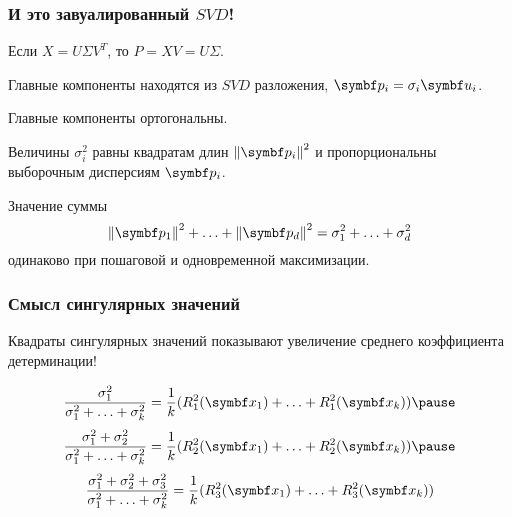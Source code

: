 \begin{frame}
  \frametitle{И это завуалированный $SVD$!}

  Если $X = U\Sigma V^T$, то $P = XV = U\Sigma$.

  Главные компоненты находятся из $SVD$ разложения, $\bp_i = \sigma_i \bu_i$. 

  Главные компоненты ортогональны. 

  Величины $\sigma^2_i$ равны квадратам длин $\norm{\bp_i}^2$ 
  и пропорциональны выборочным дисперсиям $\bp_i$.  \pause

Значение суммы 
\[
  \norm{\bp_1}^2 + \ldots + \norm{\bp_d}^2 = \sigma^2_1 + \ldots + \sigma^2_d
\]
одинаково при пошаговой и одновременной максимизации.


\end{frame}


\begin{frame}
  \frametitle{Смысл сингулярных значений}

  Квадраты сингулярных значений показывают увеличение среднего коэффициента детерминации!


\[
 \frac{\sigma^2_1}{\sigma^2_1 + \ldots + \sigma^2_k} = \frac{1}{k} (R_1^2(\bx_1) + \ldots + R_1^2(\bx_k))  \pause 
 \]
 \[
 \frac{\sigma^2_1 + \sigma^2_2}{\sigma^2_1 + \ldots + \sigma^2_k} = \frac{1}{k} (R_2^2(\bx_1) + \ldots + R_2^2(\bx_k)) \pause
 \]
\[
 \frac{\sigma^2_1 + \sigma^2_2 + \sigma^2_3}{\sigma^2_1 + \ldots + \sigma^2_k} = \frac{1}{k} (R_3^2(\bx_1) + \ldots + R_3^2(\bx_k))  
 \]

  

\end{frame}



